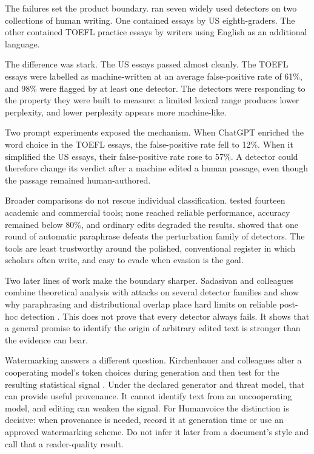 The failures set the product boundary. \citet{liang2023detectors} ran seven
widely used detectors on two collections of human writing. One contained
essays by US eighth-graders. The other contained TOEFL practice essays by
writers using English as an additional language.

The difference was stark. The US essays passed almost cleanly. The TOEFL
essays were labelled as machine-written at an average false-positive rate of
61\%, and 98\% were flagged by at least one detector. The detectors were
responding to the property they were built to measure: a limited lexical range
produces lower perplexity, and lower perplexity appears more machine-like.

Two prompt experiments exposed the mechanism. When ChatGPT enriched the word
choice in the TOEFL essays, the false-positive rate fell to 12\%. When it
simplified the US essays, their false-positive rate rose to 57\%. A detector
could therefore change its verdict after a machine edited a human passage,
even though the passage remained human-authored.

Broader comparisons do not rescue individual classification.
\citet{weberwulff2023testing} tested fourteen academic and commercial tools;
none reached reliable performance, accuracy remained below 80\%, and ordinary
edits degraded the results. \citet{krishna2023paraphrasing} showed that one
round of automatic paraphrase defeats the perturbation family of detectors.
The tools are least trustworthy around the polished, conventional register in
which scholars often write, and easy to evade when evasion is the goal.

Two later lines of work make the boundary sharper. Sadasivan and colleagues
combine theoretical analysis with attacks on several detector families and
show why paraphrasing and distributional overlap place hard limits on reliable
post-hoc detection \citep{sadasivan2024reliably}. This does not prove that every
detector always fails. It shows that a general promise to identify the origin
of arbitrary edited text is stronger than the evidence can bear.

Watermarking answers a different question. Kirchenbauer and colleagues alter a
cooperating model's token choices during generation and then test for the
resulting statistical signal \citep{kirchenbauer2023watermark}. Under the
declared generator and threat model, that can provide useful provenance. It
cannot identify text from an uncooperating model, and editing can weaken the
signal. For Humanvoice the distinction is decisive: when provenance is needed,
record it at generation time or use an approved watermarking scheme. Do not
infer it later from a document's style and call that a reader-quality result.

